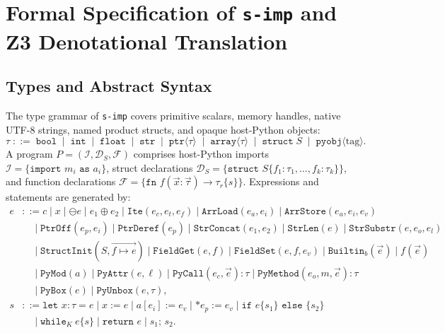 \documentclass[11pt,a4paper]{article}
\begin{document}
\section{Formal Specification of \texttt{s-imp} and Z3 Denotational Translation}
\label{sec:simp}

\subsection{Types and Abstract Syntax}

The type grammar of \texttt{s-imp} covers primitive scalars, memory handles, native UTF-8 strings, named product structs, and opaque host-Python objects:
\[
  \tau \;::=\; \texttt{bool} \;\mid\; \texttt{int} \;\mid\; \texttt{float} \;\mid\; \texttt{str} \;\mid\; \texttt{ptr}\langle\tau\rangle \;\mid\; \texttt{array}\langle\tau\rangle \;\mid\; \texttt{struct}\;S \;\mid\; \texttt{pyobj}\langle\text{tag}\rangle.
\]
A program $P = (\mathcal{I}, \mathcal{D}_S, \mathcal{F})$ comprises host-Python imports $\mathcal{I} = \{\texttt{import } m_i \texttt{ as } a_i\}$, struct declarations $\mathcal{D}_S = \{\texttt{struct } S \{ f_1 : \tau_1, \dots, f_k : \tau_k \}\}$, and function declarations $\mathcal{F} = \{\texttt{fn } f(\vec{x}:\vec{\tau}) \to \tau_r \{ s \}\}$. Expressions and statements are generated by:
\begin{align*}
  e &::= c \mid x \mid \ominus e \mid e_1 \oplus e_2 \mid \texttt{Ite}(e_c, e_t, e_f) \mid \texttt{ArrLoad}(e_a, e_i) \mid \texttt{ArrStore}(e_a, e_i, e_v) \\
    &\quad \mid \texttt{PtrOff}(e_p, e_i) \mid \texttt{PtrDeref}(e_p) \mid \texttt{StrConcat}(e_1, e_2) \mid \texttt{StrLen}(e) \mid \texttt{StrSubstr}(e, e_o, e_l) \\
    &\quad \mid \texttt{StructInit}(S, \vec{f \mapsto e}) \mid \texttt{FieldGet}(e, f) \mid \texttt{FieldSet}(e, f, e_v) \mid \texttt{Builtin}_b(\vec{e}) \mid f(\vec{e}) \\
    &\quad \mid \texttt{PyMod}(a) \mid \texttt{PyAttr}(e, \ell) \mid \texttt{PyCall}(e_c, \vec{e}):\tau \mid \texttt{PyMethod}(e_o, m, \vec{e}):\tau \\
    &\quad \mid \texttt{PyBox}(e) \mid \texttt{PyUnbox}(e, \tau), \\
  s &::= \texttt{let } x:\tau = e \mid x := e \mid a[e_i] := e_v \mid *e_p := e_v \mid \texttt{if } e \{ s_1 \} \texttt{ else } \{ s_2 \} \\
    &\quad \mid \texttt{while}_K\ e \{ s \} \mid \texttt{return } e \mid s_1;\, s_2.
\end{align*}
\end{document}
